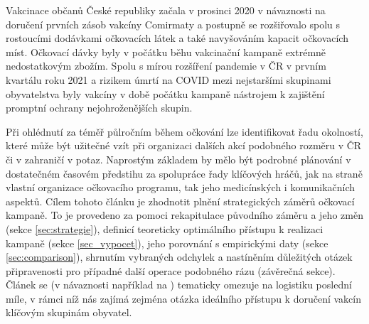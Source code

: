 Vakcinace občanů České republiky začala v prosinci 2020 v návaznosti na doručení prvních zásob vakcíny Comirmaty a postupně se rozšiřovalo spolu s rostoucími dodávkami očkovacích látek a také navyšováním kapacit očkovacích míst. %
%
Očkovací dávky byly v počátku běhu vakcinační kampaně extrémně nedostatkovým zbožím. Spolu s mírou rozšíření pandemie v ČR v prvním kvartálu roku 2021 a rizikem úmrtí na COVID mezi nejstaršími skupinami obyvatelstva byly vakcíny v době počátku kampaně nástrojem k zajištění promptní ochrany nejohroženějších skupin. %

Při ohlédnutí za téměř půlročním během očkování lze identifikovat řadu okolností, které může být užitečné vzít při organizaci dalších akcí podobného rozměru v ČR či v zahraničí v potaz. Naprostým základem by mělo být podrobné plánování v dostatečném časovém předstihu za spolupráce řady klíčových hráčů, jak na straně vlastní organizace očkovacího programu, tak jeho medicínských i komunikačních aspektů. 
%
Cílem tohoto článku je zhodnotit plnění strategických záměrů očkovací kampaně. To je provedeno za pomoci rekapitulace původního záměru a jeho změn (sekce \ref{sec:strategie}), definicí teoreticky optimálního přístupu k realizaci kampaně (sekce \ref{sec_vypocet}), jeho porovnání s empirickými daty (sekce \ref{sec:comparison}), shrnutím vybraných odchylek a nastíněním důležitých otázek připravenosti pro případné další operace podobného rázu (závěrečná sekce).
%
Článek se (v návaznosti například na \cite{lastmile}) tematicky omezuje na logistiku poslední míle, v rámci níž nás zajímá zejména otázka ideálního přístupu k doručení vakcín klíčovým skupinám obyvatel.



